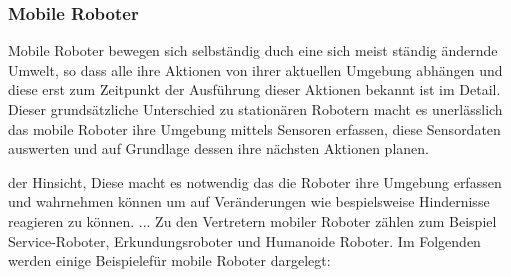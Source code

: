 \subsubsection{Mobile Roboter}
\color{process}
Mobile Roboter bewegen sich selbständig duch eine sich meist ständig ändernde Umwelt, so dass alle ihre Aktionen von ihrer aktuellen Umgebung abhängen und diese erst zum Zeitpunkt der Ausführung dieser Aktionen bekannt ist im Detail. Dieser grundsätzliche Unterschied zu stationären Robotern macht es unerlässlich das mobile Roboter ihre Umgebung mittels Sensoren
erfassen, diese Sensordaten auswerten und auf Grundlage dessen ihre nächsten Aktionen planen.

der Hinsicht, 
Diese macht es notwendig das die Roboter ihre Umgebung erfassen und wahrnehmen können um auf Veränderungen wie bespielsweise Hindernisse reagieren zu können. \newline
...
\newline
Zu den Vertretern mobiler Roboter zählen zum Beispiel Service-Roboter, Erkundungsroboter und Humanoide Roboter.
Im Folgenden werden einige Beispielefür mobile Roboter dargelegt:

